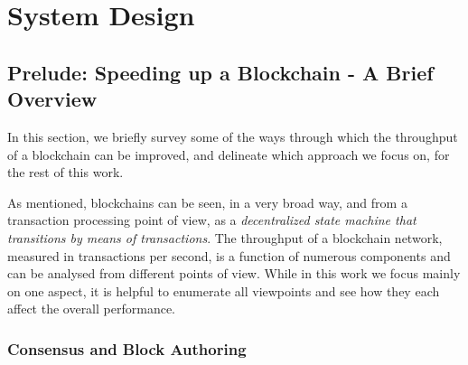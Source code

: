 \chapter{System Design} \label{chap:design}



\section{Prelude: Speeding up a Blockchain - A Brief Overview} \label{chap_design:sec:ways_to_speedup}
In this section, we briefly survey some of the ways
through which the throughput of a blockchain can be improved, and delineate which approach we
focus on, for the rest of this work.

As mentioned, blockchains can be seen, in a very broad way, and from a transaction processing point
of view, as a \textit{decentralized state machine that transitions by means of transactions}.
The throughput of a blockchain network, measured in transactions per second, is a function of numerous
components and can be analysed from different points of view. While in this work we focus mainly on
one aspect, it is helpful to enumerate all viewpoints and see how they each affect the overall
performance.

\subsection{Consensus and Block Authoring}

